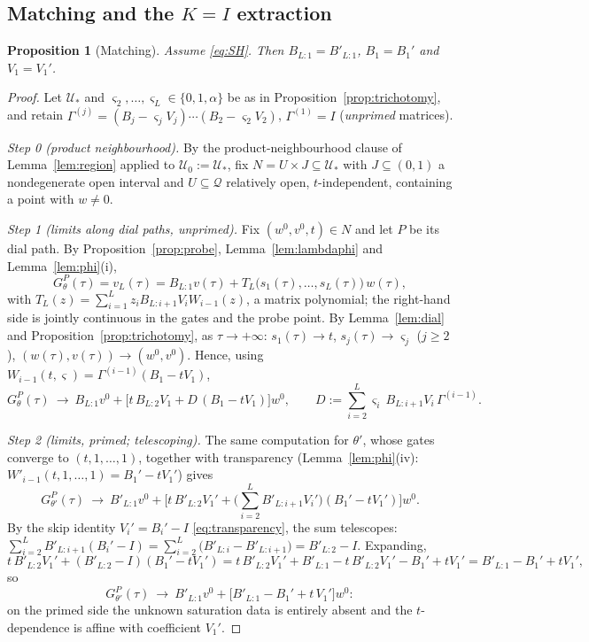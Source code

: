 \documentclass[11pt]{article}
\newtheorem{proposition}[theorem]{Proposition}
\theoremstyle{definition}
\theoremstyle{remark}
\theoremstyle{plain}
\newcommand{\cQ}{\mathcal{Q}}
\newcommand{\cU}{\mathcal{U}}
\begin{document}
\subsection{Matching and the $K=I$ extraction}

\begin{proposition}[Matching]\label{prop:matching}
Assume \eqref{eq:SH}.  Then $B_{L:1}=B'_{L:1}$, $B_1=B_1'$ and $V_1=V_1'$.
\end{proposition}

\begin{proof}
Let $\cU_*$ and $\varsigma_2,\dots,\varsigma_L\in\{0,1,\alpha\}$ be as in
Proposition~\ref{prop:trichotomy}, and retain
$\Gamma^{(j)}=(B_j-\varsigma_jV_j)\cdots(B_2-\varsigma_2V_2)$, $\Gamma^{(1)}=I$
(\emph{unprimed} matrices).

\emph{Step 0 (product neighbourhood).}  By the product-neighbourhood clause of
Lemma~\ref{lem:region} applied to $\cU_0:=\cU_*$, fix
$N=U\times J\subseteq\cU_*$ with $J\subseteq(0,1)$ a nondegenerate open interval and
$U\subseteq\cQ$ relatively open, $t$-independent, containing a point with $w\neq0$.

\emph{Step 1 (limits along dial paths, unprimed).}  Fix $(w^0,v^0,t)\in N$ and let
$P$ be its dial path.  By Proposition~\ref{prop:probe}, Lemma~\ref{lem:lambdaphi} and
Lemma~\ref{lem:phi}(i),
\[
G^P_\theta(\tau)=v_L(\tau)
=B_{L:1}v(\tau)+T_L\big(s_1(\tau),\dots,s_L(\tau)\big)\,w(\tau),
\]
with $T_L(z)=\sum_{i=1}^Lz_iB_{L:i+1}V_iW_{i-1}(z)$, a matrix polynomial; the
right-hand side is jointly continuous in the gates and the probe point.  By
Lemma~\ref{lem:dial} and Proposition~\ref{prop:trichotomy}, as $\tau\to+\infty$:
$s_1(\tau)\to t$, $s_j(\tau)\to\varsigma_j$ ($j\ge2$),
$(w(\tau),v(\tau))\to(w^0,v^0)$.  Hence, using
$W_{i-1}(t,\varsigma)=\Gamma^{(i-1)}(B_1-tV_1)$,
\begin{equation}\label{eq:limtheta}
G^P_\theta(\tau)\ \longrightarrow\
B_{L:1}v^0+\Big[t\,B_{L:2}V_1+D\,(B_1-tV_1)\Big]w^0,
\qquad
D:=\sum_{i=2}^{L}\varsigma_i\,B_{L:i+1}V_i\,\Gamma^{(i-1)} .
\end{equation}

\emph{Step 2 (limits, primed; telescoping).}  The same computation for $\theta'$,
whose gates converge to $(t,1,\dots,1)$, together with transparency
(Lemma~\ref{lem:phi}(iv): $W'_{i-1}(t,1,\dots,1)=B_1'-tV_1'$) gives
\begin{equation}\label{eq:limthetaprime-raw}
G^P_{\theta'}(\tau)\ \longrightarrow\
B'_{L:1}v^0+\Big[t\,B'_{L:2}V_1'
+\Big(\textstyle\sum_{i=2}^{L}B'_{L:i+1}V_i'\Big)(B_1'-tV_1')\Big]w^0 .
\end{equation}
By the skip identity $V_i'=B_i'-I$ \eqref{eq:transparency}, the sum telescopes:
$\sum_{i=2}^{L}B'_{L:i+1}(B_i'-I)
=\sum_{i=2}^{L}\big(B'_{L:i}-B'_{L:i+1}\big)=B'_{L:2}-I$.  Expanding,
\[
t\,B'_{L:2}V_1'+(B'_{L:2}-I)(B_1'-tV_1')
=t\,B'_{L:2}V_1'+B'_{L:1}-t\,B'_{L:2}V_1'-B_1'+tV_1'
=B'_{L:1}-B_1'+tV_1',
\]
so
\begin{equation}\label{eq:limthetaprime}
G^P_{\theta'}(\tau)\ \longrightarrow\
B'_{L:1}v^0+\big[B'_{L:1}-B_1'+t\,V_1'\big]w^0 :
\end{equation}
on the primed side the unknown saturation data is entirely absent and the
$t$-dependence is affine with coefficient $V_1'$.


\end{proof}
\end{document}
